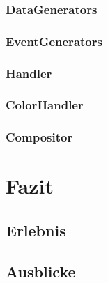 \documentclass[11pt,a4paper]{article}
\begin{document}
\subsubsection{DataGenerators}



\subsubsection{EventGenerators}

\subsubsection{Handler}
\subsubsection*{ColorHandler}

\subsubsection{Compositor}

\section{Fazit}

\subsection{Erlebnis}
\subsection{Ausblicke}

\newpage




\listoftables
\listoffigures
\end{document}
